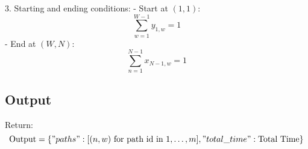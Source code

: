 \documentclass{article}
\begin{document}
3. Starting and ending conditions:
   - Start at \( (1,1) \):
   \[
   \sum_{w=1}^{W-1} y_{1,w} = 1
   \]
   - End at \( (W,N) \):
   \[
   \sum_{n=1}^{N-1} x_{N-1,w} = 1
   \]

\subsection*{Output}
Return:
\[
\text{Output} = \{ "paths": [(n, w) \text{ for path id in } 1, \ldots, m], "total\_time": \text{Total Time} \}
\]
\end{document}
